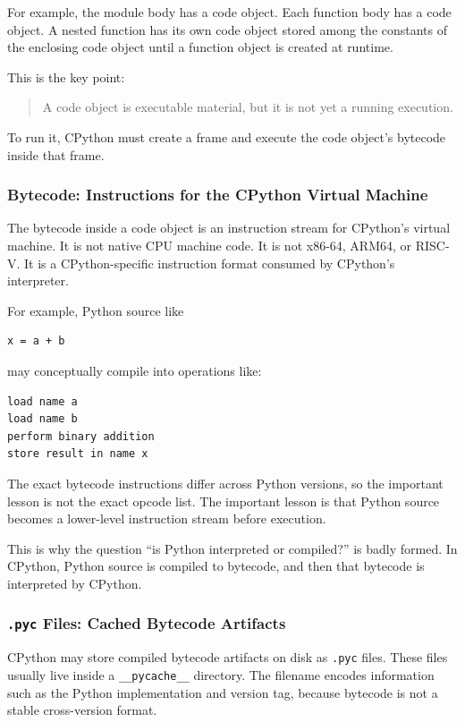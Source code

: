 For example, the module body has a code object. Each function body has a code object. A nested function has its own code object stored among the constants of the enclosing code object until a function object is created at runtime.

This is the key point:

\begin{quote}
A code object is executable material, but it is not yet a running execution.
\end{quote}

To run it, CPython must create a frame and execute the code object's bytecode inside that frame.

\subsubsection{Bytecode: Instructions for the CPython Virtual Machine}

The bytecode inside a code object is an instruction stream for CPython's virtual machine. It is not native CPU machine code. It is not x86-64, ARM64, or RISC-V. It is a CPython-specific instruction format consumed by CPython's interpreter.

For example, Python source like

\begin{verbatim}
x = a + b
\end{verbatim}

may conceptually compile into operations like:

\begin{verbatim}
load name a
load name b
perform binary addition
store result in name x
\end{verbatim}

The exact bytecode instructions differ across Python versions, so the important lesson is not the exact opcode list. The important lesson is that Python source becomes a lower-level instruction stream before execution.

This is why the question ``is Python interpreted or compiled?'' is badly formed. In CPython, Python source is compiled to bytecode, and then that bytecode is interpreted by CPython.

\subsubsection{\texttt{.pyc} Files: Cached Bytecode Artifacts}

CPython may store compiled bytecode artifacts on disk as \texttt{.pyc} files. These files usually live inside a \texttt{\_\_pycache\_\_} directory. The filename encodes information such as the Python implementation and version tag, because bytecode is not a stable cross-version format.

